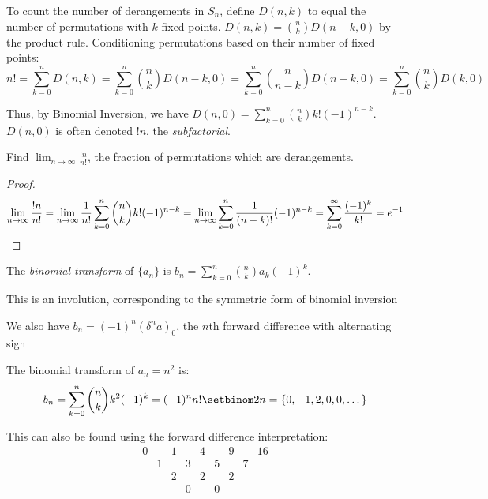\documentclass[a4paper]{article}
\begin{document}
\begin{example}\label{derangements}
To count the number of derangements in $S_n$, define $D(n,k)$ to equal the number of permutations with $k$ fixed points. $D(n,k)=\binom nkD(n-k,0)$ by the product rule. Conditioning permutations based on their number of fixed points:
\begin{equation*}
n!
=\sum_{k=0}^nD(n,k)
=\sum_{k=0}^n\binom nkD(n-k,0)
=\sum_{k=0}^n\binom n{n-k}D(n-k,0)
=\sum_{k=0}^n\binom nkD(k,0)
\end{equation*}

Thus, by Binomial Inversion, we have $D(n,0)=\sum_{k=0}^n\binom nkk!(-1)^{n-k}$. $D(n,0)$ is often denoted $!n$, the \emph{subfactorial}.
\end{example}

\begin{example}
Find $\lim_{n\rightarrow\infty}\frac{!n}{n!}$, the fraction of permutations which are derangements.

\begin{hl}
\begin{proof}
\begin{equation*}
\lim_{n\rightarrow\infty}\frac{!n}{n!}
=\lim_{n\rightarrow\infty}\frac1{n!}\sum_{k=0}^n\binom nkk!(-1)^{n-k}
=\lim_{n\rightarrow\infty}\sum_{k=0}^n\frac1{(n-k)!}(-1)^{n-k}
=\sum_{k=0}^{\infty}\frac{(-1)^{k}}{k!}
=e^{-1}\qedhere
\end{equation*}
\end{proof}
\end{hl}
\end{example}

\begin{definition}
The \emph{binomial transform} of $\{a_n\}$ is $b_n=\sum_{k=0}^n\binom nka_k(-1)^k$.
\begin{arrows}
\item This is an involution, corresponding to the symmetric form of binomial inversion
\item We also have $b_n=(-1)^n(\delta^na)_0$, the $n$th forward difference with alternating sign
\end{arrows}
\end{definition}

\begin{example}
The binomial transform of $a_n=n^2$ is:
\begin{equation*}
b_n=\sum_{k=0}^n\binom nkk^2(-1)^k=(-1)^nn!\setbinom 2n=\{0,-1,2,0,0,\dots\}
\end{equation*}

This can also be found using the forward difference interpretation:
\begin{equation*}
\begin{array}{ccccccccc}
\boxed{0}&&1&&4&&9&&16\\
&\boxed{1}&&3&&5&&7\\
&&\boxed{2}&&2&&2\\
&&&\boxed{0}&&0
\end{array}
\end{equation*}
\end{example}
\end{document}
